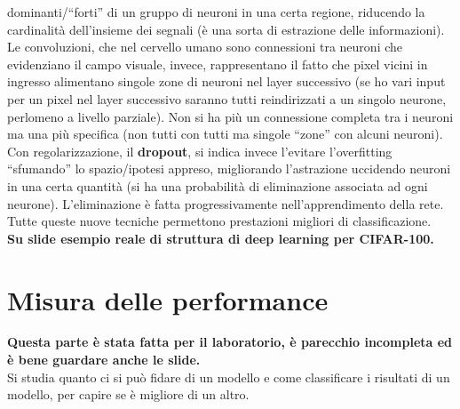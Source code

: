 dominanti/``forti'' di un gruppo di neuroni in una certa regione, riducendo la
cardinalità dell'insieme dei segnali (è una sorta di estrazione delle
informazioni). Le convoluzioni, che nel cervello umano sono 
connessioni tra neuroni che evidenziano il campo visuale, invece, rappresentano
il fatto che pixel vicini in ingresso alimentano singole zone di neuroni nel
layer successivo (se ho vari input per un pixel nel layer successivo saranno
tutti reindirizzati a un singolo neurone, perlomeno a livello parziale). Non si
ha più un connessione completa tra i neuroni ma una più specifica (non tutti con
tutti ma singole ``zone'' con alcuni neuroni).\\
Con regolarizzazione, il \textbf{dropout}, si indica invece l'evitare
l'overfitting ``sfumando'' lo spazio/ipotesi appreso, migliorando l'astrazione
uccidendo neuroni in una certa quantità (si ha una probabilità di eliminazione
associata ad ogni neurone). L'eliminazione è fatta progressivamente
nell'apprendimento della rete. \\
Tutte queste nuove tecniche permettono prestazioni migliori di
classificazione.\\
\textbf{Su slide esempio reale di struttura di deep learning per CIFAR-100.}
\chapter{Misura delle performance}
\textbf{Questa parte è stata fatta per il laboratorio, è parecchio incompleta ed
è bene guardare anche le slide.}\\
Si studia quanto ci si può fidare di un modello e come classificare i risultati
di un modello, per capire se è migliore di un altro.
